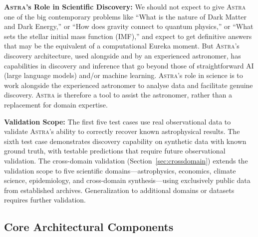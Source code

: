 \documentclass[fleqn,usenatbib]{mnras}
\newcommand{\astra}{\textsc{Astra}\xspace}
\begin{document}
\textbf{\astra's Role in Scientific Discovery:}
We should not expect to give \astra one of the big contemporary problems like ``What is the nature of Dark Matter and Dark Energy,'' or ``How does gravity connect to quantum physics,'' or ``What sets the stellar initial mass function (IMF),'' and expect to get definitive answers that may be the equivalent of a computational Eureka moment.
But \astra's discovery architecture, used alongside and by an experienced astronomer, has capabilities in discovery and inference that go beyond those of straightforward AI (large language models) and/or machine learning.
\astra's role in science is to work alongside the experienced astronomer to analyse data and facilitate genuine discovery.
\astra is therefore a tool to assist the astronomer, rather than a replacement for domain expertise.

\textbf{Validation Scope:}
The first five test cases use real observational data to validate \astra's ability to correctly recover known astrophysical results.
The sixth test case demonstrates discovery capability on synthetic data with known ground truth, with testable predictions that require future observational validation.
The cross-domain validation (Section~\ref{sec:crossdomain}) extends the validation scope to five scientific domains---astrophysics, economics, climate science, epidemiology, and cross-domain synthesis---using exclusively public data from established archives.
Generalization to additional domains or datasets requires further validation.

\subsection{Core Architectural Components}
\label{sec:methods:components}
\end{document}
